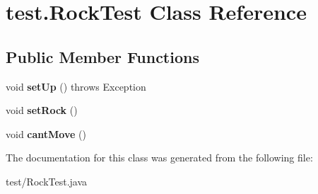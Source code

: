\hypertarget{classtest_1_1RockTest}{\section{test.\-Rock\-Test Class Reference}
\label{classtest_1_1RockTest}
}
\subsection*{Public Member Functions}
\begin{DoxyCompactItemize}
\item 
\hypertarget{classtest_1_1RockTest_a1d8c12b4b9c99dca528ffb0f8d91a40e}{void {\bfseries set\-Up} ()  throws Exception }\label{classtest_1_1RockTest_a1d8c12b4b9c99dca528ffb0f8d91a40e}

\item 
\hypertarget{classtest_1_1RockTest_a29ef94577334161340abc4488b7ca165}{void {\bfseries set\-Rock} ()}\label{classtest_1_1RockTest_a29ef94577334161340abc4488b7ca165}

\item 
\hypertarget{classtest_1_1RockTest_af23c2609070b15ffb6893ba1e6024e0a}{void {\bfseries cant\-Move} ()}\label{classtest_1_1RockTest_af23c2609070b15ffb6893ba1e6024e0a}

\end{DoxyCompactItemize}


The documentation for this class was generated from the following file\-:\begin{DoxyCompactItemize}
\item 
test/Rock\-Test.\-java\end{DoxyCompactItemize}
